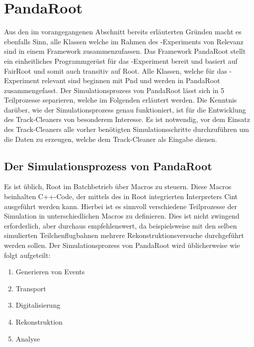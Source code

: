 \section{PandaRoot}
Aus den im vorangegangenen Abschnitt bereits erläuterten Gründen macht es ebenfalls Sinn, alle Klassen welche im Rahmen des \pnd{}-Experiments von Relevanz sind in einem Framework zusammenzufassen. Das Framework PandaRoot stellt ein einheitliches Programmgerüst für das \pnd{}-Experiment bereit und basiert auf FairRoot und somit auch transitiv auf Root. Alle Klassen, welche für das \pnd{}-Experiment relevant sind beginnen mit Pnd und werden in PandaRoot zusammengefasst. Der Simulationsprozess von PandaRoot lässt sich in 5 Teilprozesse separieren, welche im Folgenden erläutert werden. Die Kenntnis darüber, wie der Simulationsprozess genau funktioniert, ist für die Entwicklung des Track-Cleaners von besonderem Interesse. Es ist notwendig, vor dem Einsatz des Track-Cleaners alle vorher benötigten Simulationsschritte durchzuführen um die Daten zu erzeugen, welche dem Track-Cleaner als Eingabe dienen.

\subsection{Der Simulationsprozess von PandaRoot}
Es ist üblich, Root im Batchbetrieb über Macros zu steuern. Diese Macros beinhalten C++-Code, der mittels des in Root integrierten Interpreters Cint ausgeführt werden kann. Hierbei ist es sinnvoll verschiedene Teilprozesse der Simulation in unterschiedlichen Macros zu definieren. Dies ist nicht zwingend erforderlich, aber durchaus empfehlenswert, da beispielsweise mit den selben simulierten Teilchenflugbahnen mehrere Rekonstruktionsversuche durchgeführt werden sollen. Der Simulationsprozess von PandaRoot wird üblicherweise wie folgt aufgeteilt:

\begin{enumerate}
	\item Generieren von Events
	\item Transport
	\item Digitalisierung
	\item Rekonstruktion
	\item Analyse
\end{enumerate}

